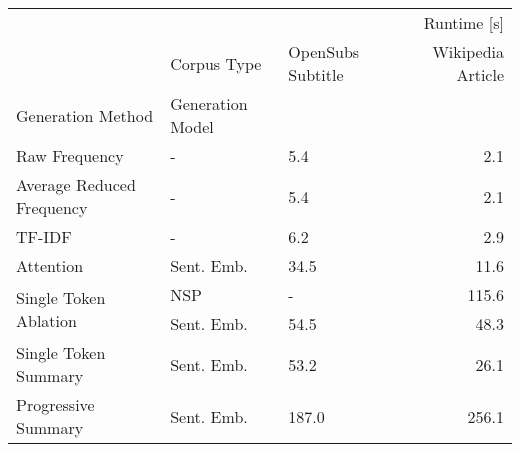 \begin{tabular}{lllr}
\toprule
 &  & \multicolumn{2}{r}{Runtime [s]} \\
 & Corpus Type & OpenSubs Subtitle & Wikipedia Article \\
Generation Method & Generation Model &  &  \\
\midrule
Raw Frequency & - & 5.4 & 2.1 \\
\cline{1-4}
Average Reduced Frequency & - & 5.4 & 2.1 \\
\cline{1-4}
TF-IDF & - & 6.2 & 2.9 \\
\cline{1-4}
Attention & Sent. Emb. & 34.5 & 11.6 \\
\cline{1-4}
\multirow[t]{2}{*}{Single Token Ablation} & NSP & - & 115.6 \\
 & Sent. Emb. & 54.5 & 48.3 \\
\cline{1-4}
Single Token Summary & Sent. Emb. & 53.2 & 26.1 \\
\cline{1-4}
Progressive Summary & Sent. Emb. & 187.0 & 256.1 \\
\cline{1-4}
\bottomrule
\end{tabular}

